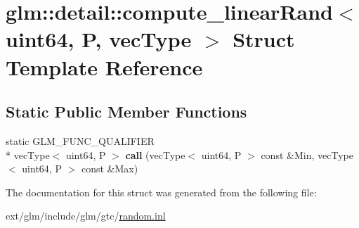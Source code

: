 \hypertarget{structglm_1_1detail_1_1compute__linear_rand_3_01uint64_00_01_p_00_01vec_type_01_4}{\section{glm\-:\-:detail\-:\-:compute\-\_\-linear\-Rand$<$ uint64, P, vec\-Type $>$ Struct Template Reference}
\label{structglm_1_1detail_1_1compute__linear_rand_3_01uint64_00_01_p_00_01vec_type_01_4}
}
\subsection*{Static Public Member Functions}
\begin{DoxyCompactItemize}
\item 
\hypertarget{structglm_1_1detail_1_1compute__linear_rand_3_01uint64_00_01_p_00_01vec_type_01_4_afc443abbff12752de8c78096639a6ff4}{static G\-L\-M\-\_\-\-F\-U\-N\-C\-\_\-\-Q\-U\-A\-L\-I\-F\-I\-E\-R \\*
vec\-Type$<$ uint64, P $>$ {\bfseries call} (vec\-Type$<$ uint64, P $>$ const \&Min, vec\-Type$<$ uint64, P $>$ const \&Max)}\label{structglm_1_1detail_1_1compute__linear_rand_3_01uint64_00_01_p_00_01vec_type_01_4_afc443abbff12752de8c78096639a6ff4}

\end{DoxyCompactItemize}


The documentation for this struct was generated from the following file\-:\begin{DoxyCompactItemize}
\item 
ext/glm/include/glm/gtc/\hyperlink{random_8inl}{random.\-inl}\end{DoxyCompactItemize}
